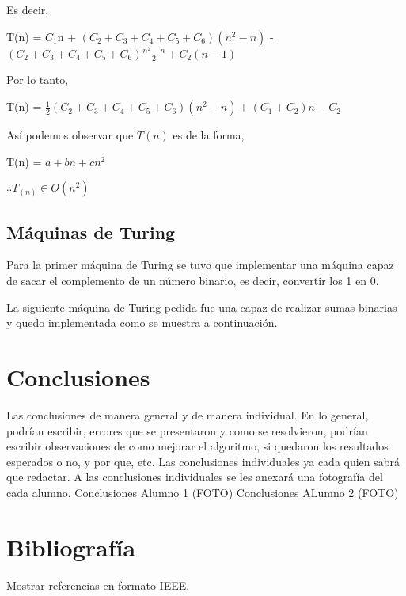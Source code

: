 \documentclass[12pt,twoside]{article}
\begin{document}
Es decir,
\begin{center}
T(n) = $C_{1}$n + $(C_{2} + C_{3} + C_{4} + C_{5} + C_{6})(n^{2} - n)$ - $(C_{2} + C_{3} + C_{4} + C_{5} + C_{6})\frac{n^{2}-n}{2} + C_{2}(n - 1)$ \\
\end{center}
Por lo tanto,
\begin{center}
T(n) = $\frac{1}{2}(C_{2} + C_{3} + C_{4} + C_{5} + C_{6})(n^{2}-n) + (C_{1} + C_{2})n - C_{2}$
\end{center}
Así podemos observar que $T(n)$ es de la forma,
\begin{center}
T(n) = $a + bn + cn^{2}$
\end{center}
\begin{center}
$\therefore T_{(n)}\in O{(n^{2})}$
\end{center}
\subsection{Máquinas de Turing}
Para la primer máquina de Turing se tuvo que implementar una máquina capaz de sacar el complemento de un número binario, es decir, convertir los 1 en 0.
\newline
\newline
La siguiente máquina de Turing pedida fue una capaz de realizar sumas binarias y quedo implementada como se muestra a continuación.

\section{Conclusiones}
Las conclusiones de manera general y de manera individual. En lo general, podr\'ian escribir,
errores que se presentaron y como se resolvieron, podr\'ian escribir observaciones de como
mejorar el algoritmo, si quedaron los resultados esperados o no, y por que, etc.
Las conclusiones individuales ya cada quien sabr\'a que redactar. A las conclusiones individuales
se les anexar\'a una fotografía del cada alumno.
Conclusiones Alumno 1 (FOTO)
Conclusiones ALumno 2 (FOTO)
\section{Bibliograf\'ia}
Mostrar referencias en formato IEEE.
\end{document}
